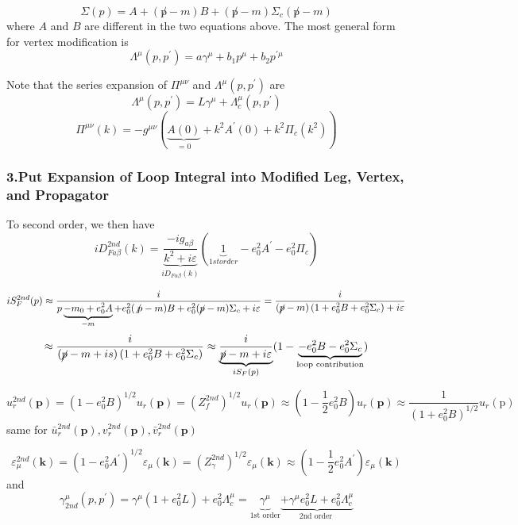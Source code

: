 $$
\Sigma(p)= A+(\not p-m) B +(\not p-m) \Sigma_{c}(\not p-m)
$$
where $A$ and $B$ are different in the two equations above. The most general form for vertex modification is
$$\Lambda^{\mu}(p,p^{\prime})=a \gamma^{\mu}+b_{1} p^{\mu}+b_{2} p^{\prime\mu}$$

Note that the series expansion of $\Pi^{\mu\nu}$ and $\Lambda^{\mu}(p,p^{\prime})$ are 
$$\Lambda^{\mu}\left(p, p^{\prime}\right)=L \gamma^{\mu}+\Lambda_{c}^{\mu}\left(p, p^{\prime}\right)$$
$$\Pi^{\mu \nu}(k)=-g^{\mu \nu}\left(\underbrace{A(0)}_{=0}+k^{2} A^{\prime}(0)+k^{2} \Pi_{c}\left(k^{2}\right)\right)$$

\subsubsection{3.Put Expansion of Loop Integral into Modified Leg, Vertex, and Propagator}
To second order, we then have
\begin{equation}
    i D_{F a \beta}^{2 n d}(k)=\underbrace{\frac{-i g_{a \beta}}{k^{2}+i \varepsilon}}_{iD_{F\alpha\beta}(k)}\left(\underbrace{1}_{1st order}-e_{0}^{2} A^{\prime}-e_{0}^{2} \Pi_{c}\right)
    \label{iD-2nd}
\end{equation}

$$i S_{F}^{2 n d}(p) \approx \frac{i}{p \underbrace{-m_{0}+e_{0}^{2} A}_{-m}+e_{0}^{2}(\not p-m) B+e_{0}^{2}(\cancel{p}-m) \Sigma_{c}+i \varepsilon}=\frac{i}{(\cancel{p}-m)\left(1+e_{0}^{2} B+e_{0}^{2} \Sigma_{c}\right)+i \varepsilon}$$
\begin{equation}
    \approx \frac{i}{\left(\cancel{p}-m+i s\right)\left(1+e_{0}^{2} B+e_{0}^{2} \Sigma_{c}\right)}\approx \underbrace{\frac{i}{\cancel{p}-m+i \varepsilon}}_{iS_{F}(p)}(1-\underbrace{-e_{0}^{2} B-e_{0}^{2} \Sigma_{c}}_{\text{loop contribution}})
\end{equation}

\begin{equation}
    u_{r}^{2 n d}(\mathbf{p})=\left(1-e_{0}^{2} B\right)^{1 / 2} u_{r}(\mathbf{p})=\left(Z_{f}^{2 n d}\right)^{1 / 2} u_{r}(\mathbf{p}) \approx\left(1-\frac{1}{2} e_{0}^{2} B\right) u_{r}(\mathbf{p})\approx\frac{1}{\left(1+e_{0}^{2} B\right)^{1 / 2}} u_{r}(\mathrm{p})
\end{equation}
same for $\bar{u}_{r}^{2 n d}(\mathbf{p}), v_{r}^{2 n d}(\mathbf{p}), \bar{v}_{r}^{2 n d}(\mathbf{p})$

$$\varepsilon_{\mu}^{2 n d}(\mathbf{k})=\left(1-e_{0}^{2} A^{\prime}\right)^{1 / 2} \varepsilon_{\mu}(\mathbf{k})=\left(Z_{\gamma}^{2 n d}\right)^{1 / 2} \varepsilon_{\mu}(\mathbf{k})\approx\left(1-\frac{1}{2} e_{0}^{2} A^{\prime}\right) \varepsilon_{\mu}(\mathbf{k})$$
and
\begin{equation}
    \gamma_{2 n d}^{\mu}\left(p, p^{\prime}\right)=\gamma^{\mu}\left(1+e_{0}^{2} L\right)+e_{0}^{2} \Lambda_{c}^{\mu}=\underbrace{\gamma^{\mu}}_{\text {1st order}} \underbrace{+\gamma^{\mu} e_{0}^{2} L+e_{0}^{2} \Lambda_{c}^{\mu}}_{\text {2nd order }}
    \label{gamma-2nd}
\end{equation}

